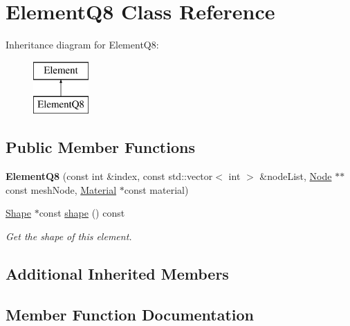 \hypertarget{class_element_q8}{}\section{Element\+Q8 Class Reference}
\label{class_element_q8}
Inheritance diagram for Element\+Q8\+:\begin{figure}[H]
\begin{center}
\leavevmode
\includegraphics[height=2.000000cm]{class_element_q8}
\end{center}
\end{figure}
\subsection*{Public Member Functions}
\begin{DoxyCompactItemize}
\item 
\mbox{\label{class_element_q8_a9cde8e57cd19b462443b0b20941455ed}} 
{\bfseries Element\+Q8} (const int \&index, const std\+::vector$<$ int $>$ \&node\+List, \mbox{\hyperlink{class_node}{Node}} $\ast$$\ast$const mesh\+Node, \mbox{\hyperlink{class_material}{Material}} $\ast$const material)
\item 
\mbox{\hyperlink{class_shape}{Shape}} $\ast$const \mbox{\hyperlink{class_element_q8_a1d2c3824da803df5eb9cdd36acf48874}{shape}} () const
\begin{DoxyCompactList}\small\item\em Get the shape of this element. \end{DoxyCompactList}\end{DoxyCompactItemize}
\subsection*{Additional Inherited Members}


\subsection{Member Function Documentation}
\mbox{\label{class_element_q8_a1d2c3824da803df5eb9cdd36acf48874}} 
